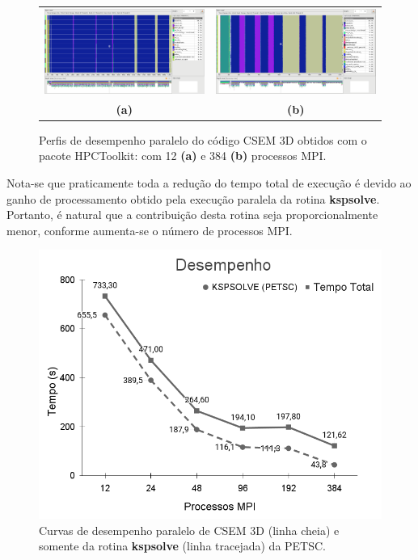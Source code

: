 \documentclass[12pt]{article}
\begin{document}
\begin{figure}[hb]
\centering
\begin{tabular}{cc}
\includegraphics[width=.5\textwidth]{figures/openmpi/Nodes1_MPI12.png} & \includegraphics[width=.5\textwidth]{figures/openmpi/Nodes16_MPI384.png} \\
 \textbf{(a)} & \textbf{(b)} 
\end{tabular}
\caption{Perfis de desempenho paralelo do código CSEM 3D obtidos com o pacote HPCToolkit: com 12 \textbf{(a)} e 384 \textbf{(b)} processos MPI.}
\label{fig:nodesresults}
\end{figure}

Nota-se que praticamente toda a redução do tempo total de execução é devido ao ganho de processamento obtido pela execução paralela da rotina {\ttfamily \textbf{kspsolve}}. Portanto, é natural que a contribuição desta rotina seja proporcionalmente menor, conforme aumenta-se o número de processos MPI.

\begin{figure}[ht]
\centering
\includegraphics[width=.5\textwidth]{figures/openmpi/desempenho.png}
\caption{Curvas de desempenho paralelo de CSEM 3D (linha cheia) e somente da rotina {\ttfamily \textbf{kspsolve}} (linha tracejada) da PETSC. }
\label{fig:desempenho}
\end{figure}
\end{document}
